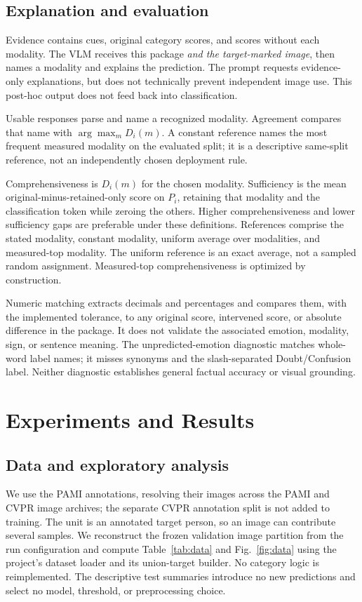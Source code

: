 \documentclass[conference]{IEEEtran}
\begin{document}
\subsection{Explanation and evaluation}
Evidence contains cues, original category scores, and scores without each modality. The VLM receives this package \emph{and the target-marked image}, then names a modality and explains the prediction. The prompt requests evidence-only explanations, but does not technically prevent independent image use. This post-hoc output does not feed back into classification.

Usable responses parse and name a recognized modality. Agreement compares that name with $\arg\max_m D_i(m)$. A constant reference names the most frequent measured modality on the evaluated split; it is a descriptive same-split reference, not an independently chosen deployment rule.

Comprehensiveness is $D_i(m)$ for the chosen modality. Sufficiency is the mean original-minus-retained-only score on $P_i$, retaining that modality and the classification token while zeroing the others. Higher comprehensiveness and lower sufficiency gaps are preferable under these definitions. References comprise the stated modality, constant modality, uniform average over modalities, and measured-top modality. The uniform reference is an exact average, not a sampled random assignment. Measured-top comprehensiveness is optimized by construction.

Numeric matching extracts decimals and percentages and compares them, with the implemented tolerance, to any original score, intervened score, or absolute difference in the package. It does not validate the associated emotion, modality, sign, or sentence meaning. The unpredicted-emotion diagnostic matches whole-word label names; it misses synonyms and the slash-separated Doubt/Confusion label. Neither diagnostic establishes general factual accuracy or visual grounding.

\section{Experiments and Results}\label{sec:experiments}
\subsection{Data and exploratory analysis}\label{sec:data}
We use the PAMI annotations, resolving their images across the PAMI and CVPR image archives; the separate CVPR annotation split is not added to training. The unit is an annotated target person, so an image can contribute several samples. We reconstruct the frozen validation image partition from the run configuration and compute Table~\ref{tab:data} and Fig.~\ref{fig:data} using the project's dataset loader and its union-target builder. No category logic is reimplemented. The descriptive test summaries introduce no new predictions and select no model, threshold, or preprocessing choice.
\end{document}
